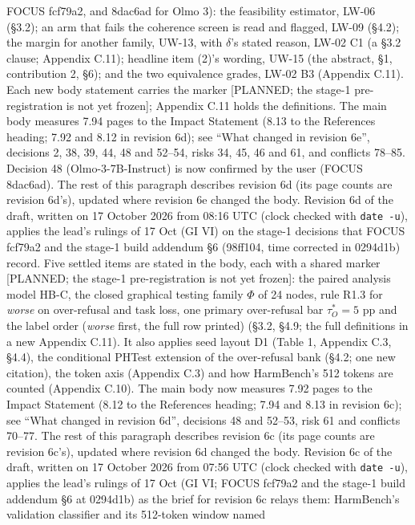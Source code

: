 \documentclass{article}
\theoremstyle{plain}
\theoremstyle{definition}
\theoremstyle{remark}
\begin{document}
FOCUS fcf79a2, and 8dac6ad for Olmo 3): the feasibility estimator, LW-06
(\S{}3.2); an arm that fails the coherence screen is read and flagged, LW-09
(\S{}4.2); the margin for another family, UW-13, with $\delta$'s stated reason,
LW-02 C1 (a \S{}3.2 clause; Appendix C.11); headline item (2)'s wording, UW-15
(the abstract, \S{}1, contribution 2, \S{}6); and the two equivalence grades,
LW-02 B3 (Appendix C.11). Each new body statement carries the marker [PLANNED;
the stage-1 pre-registration is not yet frozen]; Appendix C.11 holds the
definitions. The main body measures 7.94 pages to the Impact Statement (8.13 to
the References heading; 7.92 and 8.12 in revision 6d); see ``What changed in
revision 6e'', decisions 2, 38, 39, 44, 48 and 52--54, risks 34, 45, 46 and 61,
and conflicts 78--85. Decision 48 (Olmo-3-7B-Instruct) is now confirmed by the
user (FOCUS 8dac6ad). The rest of this paragraph describes revision 6d (its page
counts are revision 6d's), updated where revision 6e changed the body. Revision
6d of the draft, written on 17 October 2026 from 08:16 UTC (clock checked with
\texttt{date -u}), applies the lead's rulings of 17 Oct (GI VI) on the stage-1
decisions that FOCUS fcf79a2 and the stage-1 build addendum \S{}6 (98ff104, time
corrected in 0294d1b) record. Five settled items are stated in the body, each
with a shared marker [PLANNED; the stage-1 pre-registration is not yet frozen]:
the paired analysis model HB-C, the closed graphical testing family $\Phi$ of 24
nodes, rule R1.3 for \emph{worse} on over-refusal and task loss, one primary
over-refusal bar $\tau_O^* = 5$ pp and the label order (\emph{worse} first, the
full row printed) (\S{}3.2, \S{}4.9; the full definitions in a new Appendix
C.11). It also applies seed layout D1 (Table 1, Appendix C.3, \S{}4.4), the
conditional PHTest extension of the over-refusal bank (\S{}4.2; one new
citation), the token axis (Appendix C.3) and how HarmBench's 512 tokens are
counted (Appendix C.10). The main body now measures 7.92 pages to the Impact
Statement (8.12 to the References heading; 7.94 and 8.13 in revision 6c); see
``What changed in revision 6d'', decisions 48 and 52--53, risk 61 and conflicts
70--77. The rest of this paragraph describes revision 6c (its page counts are
revision 6c's), updated where revision 6d changed the body. Revision 6c of the
draft, written on 17 October 2026 from 07:56 UTC (clock checked with
\texttt{date -u}), applies the lead's rulings of 17 Oct (GI VI; FOCUS fcf79a2
and the stage-1 build addendum \S{}6 at 0294d1b) as the brief for revision 6c
relays them: HarmBench's validation classifier and its 512-token window named
\end{document}
